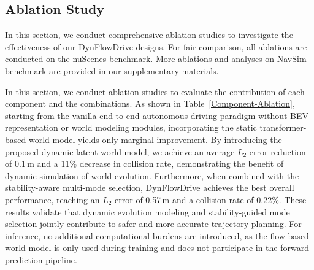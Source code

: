 \subsection{Ablation Study}
In this section, we conduct comprehensive ablation studies to investigate the effectiveness of our DynFlowDrive designs. For fair comparison, all ablations are conducted on the nuScenes benchmark. More ablations and analyses on NavSim benchmark are provided in our supplementary materials.

In this section, we conduct ablation studies to evaluate the contribution of each component and the combinations. As shown in Table~\ref{Component-Ablation}, starting from the vanilla end-to-end autonomous driving paradigm without BEV representation or world modeling modules, incorporating the static transformer-based world model yields only marginal improvement. By introducing the proposed dynamic latent world model, we achieve an average $L_2$ error reduction of 0.1\,m and a 11\% decrease in collision rate, demonstrating the benefit of dynamic simulation of world evolution. Furthermore, when combined with the stability-aware multi-mode selection, DynFlowDrive achieves the best overall performance, reaching an $L_2$ error of 0.57\,m and a collision rate of 0.22\%. These results validate that dynamic evolution modeling and stability-guided mode selection jointly contribute to safer and more accurate trajectory planning. For inference, no additional computational burdens are introduced, as the flow-based world model is only used during training and does not participate in the forward prediction pipeline. 

